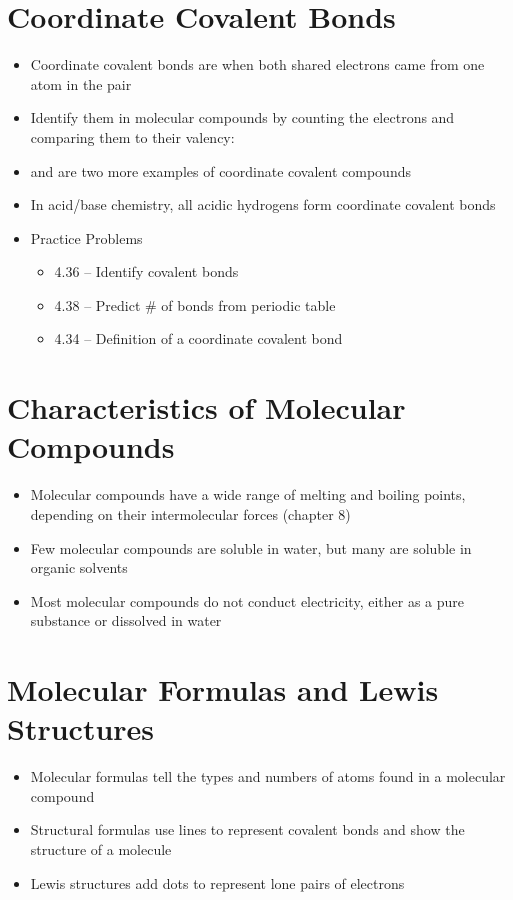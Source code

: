 \documentclass[12pt, openany, letterpaper]{memoir}
\begin{document}
\section{Coordinate Covalent Bonds}
\begin{itemize}
	\item Coordinate covalent bonds are when both shared electrons came from one atom in the pair
	\item Identify them in molecular compounds by counting the electrons and comparing them to their valency: 
	\item {} and  are two more examples of coordinate covalent compounds
	\item In acid/base chemistry, all acidic hydrogens form coordinate covalent bonds
	\item Practice Problems
	\begin{itemize}
		\item 4.36 -- Identify covalent bonds
		\item 4.38 -- Predict \# of bonds from periodic table
		\item 4.34 -- Definition of a coordinate covalent bond
	\end{itemize}	
\end{itemize}
\section{Characteristics of Molecular Compounds}
\begin{itemize}
	\item Molecular compounds have a wide range of melting and boiling points, depending on their intermolecular forces (chapter 8)
	\item Few molecular compounds are soluble in water, but many are soluble in organic solvents
	\item Most molecular compounds do not conduct electricity, either as a pure substance or dissolved in water
\end{itemize}
\section{Molecular Formulas and Lewis Structures}
\begin{itemize}
	\item Molecular formulas tell the types and numbers of atoms found in a molecular compound
	\item Structural formulas use lines to represent covalent bonds and show the structure of a molecule
	\item Lewis structures add dots to represent lone pairs of electrons
\end{itemize}
\end{document}
